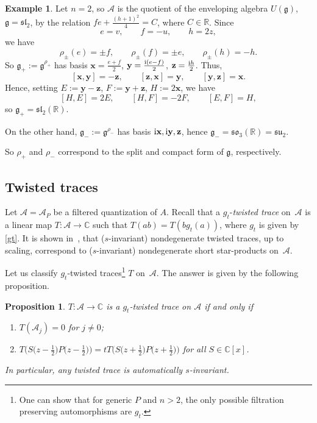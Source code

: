 \documentclass[10pt,a4paper]{amsart}
\newcommand{\CN}{\mathbb{C}} %
\newcommand{\mc}[1]{\mathcal{#1}}
\newcommand{\g}{\mathfrak{g}}
\newtheorem{Proposition}[Theorem]{Proposition}
\theoremstyle{definition}
\newtheorem{Example}[Theorem]{Example}
\numberwithin{equation}{section}
\begin{document}
\begin{Example} Let $n=2$, so $\mc A$ is the quotient
of the enveloping algebra $U(\g)$, $\g=\mathfrak{sl}_2$, by the relation $fe+\frac{(h+1)^2}{4}=C$, where
$C\in \mathbb R$. Since
\[
e=v,\qquad f=-u,\qquad h=2z,
\]
we have
\[
\rho_\pm(e)=\pm f,\qquad \rho_\pm(f)=\pm e,\qquad \rho_\pm(h)=-h.
\]
So $\g_+:=\g^{\rho_+}$ has basis
$\mathbf{x}=\frac{e+f}{2}$, $\mathbf{y}=\frac{{\rm i}(e-f)}{2}$, $\mathbf{z}=\frac{{\rm i}h}{2}$.
Thus,
\[
[\mathbf{x},\mathbf{y}]=-\mathbf{z},\qquad [\mathbf{z},\mathbf{x}]=\mathbf{y},\qquad [\mathbf{y},\mathbf{z}]=\mathbf{x}.
\]
Hence, setting $E:=\mathbf{y}-\mathbf{z}$, $F:=\mathbf{y}+\mathbf{z}$, $H:=2\mathbf{x}$,
we have
\[
[H,E]=2E,\qquad [H,F]=-2F,\qquad [E,F]=H,
\]
so $\g_+=\mathfrak{sl}_2(\mathbb R)$.

On the other hand, $\g_-:=\g^{\rho_-}$ has basis
${\rm i}\mathbf{x},{\rm i}\mathbf{y},\mathbf{z}$, hence $\g_-=\mathfrak{so}_3(\mathbb R)=\mathfrak{su}_2$.

So $\rho_+$ and $\rho_-$ correspond to the split and compact form of $\g$, respectively.
\end{Example}

\subsection{Twisted traces}
Let $\mc A=\mc A_P$ be a filtered quantization of $A$. Recall \cite[Section~3.1]{ES} that a $g_t$-{\it twisted trace} on~$\mc A$ is a linear map $T\colon \mc{A}\to \CN$ such that $T(ab)=T(bg_t(a))$, where $g_t$ is given by \eqref{gt}. It is shown in~\cite[Section~3]{ES}, that ($s$-invariant) nondegenerate twisted traces, up to scaling, correspond to ($s$-invariant) nondegenerate short star-products on~$\mc A$.

Let us classify $g_t$-twisted traces\footnote{One can show that for generic $P$ and $n>2$, the only possible filtration preserving automorphisms are $g_t$.} $T$ on~$\mc A$. The answer is given by the following proposition.

\begin{Proposition}
$T\colon\mc{A}\to \CN$ is a $g_t$-twisted trace on $\mc{A}$ if and only if
\begin{enumerate}\itemsep=0pt
\item[$(1)$]
$T(\mc{A}_j)=0$ for $j\ne 0$;
\item[$(2)$]
$T\big(S\big(z-\tfrac{1}{2}\big)P\big(z-\tfrac{1}{2}\big)\big)
=tT\big( S\big(z+\tfrac{1}{2}\big)P\big(z+\tfrac{1}{2}\big)\big)$ for all $S \in\CN[x]$.
\end{enumerate}
In particular, any twisted trace is automatically $s$-invariant.
\end{Proposition}
\end{document}
